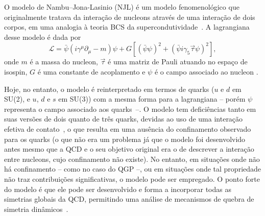 O modelo de Nambu--Jona-Lasinio (NJL) é um modelo fenomenológico que originalmente tratava da interação de nucleons através de uma interação de dois corpos, em uma analogia à teoria BCS da supercondutividade~\parencite{Buballa}. A lagrangiana desse modelo é dada por
\begin{equation}
	\mathcal{L} = \bar{\psi}(i\gamma^\mu\partial_\mu - m)\psi + G[(\bar{\psi}\psi)^2 + (\bar{\psi}i\gamma_5\vec{\tau}\psi)^2],
\end{equation}
%
onde $m$ é a massa do nucleon, $\vec{\tau}$ é uma matriz de Pauli atuando no espaço de isospin, $G$ é uma constante de acoplamento e $\psi$ é o campo associado ao nucleon \parencite{Buballa}.

Hoje, no entanto, o modelo é reinterpretado em termos de quarks ($u$ e $d$ em SU(2), e $u$, $d$ e $s$ em SU(3)) com a mesma forma para a lagrangiana -- porém $\psi$ representa o campo associado aos quarks~--. O modelo tem deficiências tanto em suas versões de dois quanto de três quarks, devidas ao uso de uma interação efetiva de contato~\parencite{Klevansky}, o que resulta em uma ausência do confinamento observado para os quarks (o que não era um problema já que o modelo foi desenvolvido antes mesmo que a QCD e o seu objetivo original era o de descrever a interação entre nucleons, cujo confinamento não existe). No entanto, em situações onde não há confinamento -- como no caso do QGP --, ou em situações onde tal propriedade não traz contribuições significativas, o modelo pode ser empregado. O ponto forte do modelo é que ele pode ser desenvolvido e forma a incorporar todas as simetrias globais da QCD, permitindo uma análise de mecanismos de quebra de simetria dinâmicos~\parencite{Vogl}.


